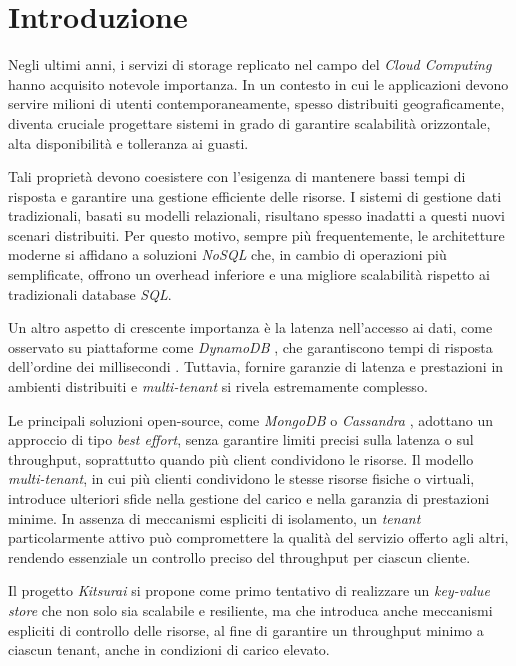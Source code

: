 \section{Introduzione}
\label{sec:introduzione}

Negli ultimi anni, i servizi di storage replicato nel campo del \textit{Cloud Computing} hanno acquisito notevole importanza.
In un contesto in cui le applicazioni devono servire milioni di utenti contemporaneamente, spesso distribuiti geograficamente, diventa cruciale progettare sistemi in grado di garantire scalabilità orizzontale, alta disponibilità e tolleranza ai guasti.

Tali proprietà devono coesistere con l'esigenza di mantenere bassi tempi di risposta e garantire una gestione efficiente delle risorse.
I sistemi di gestione dati tradizionali, basati su modelli relazionali, risultano spesso inadatti a questi nuovi scenari distribuiti.
Per questo motivo, sempre più frequentemente, le architetture moderne si affidano a soluzioni \textit{NoSQL} che, in cambio di operazioni più semplificate, offrono un overhead inferiore e una migliore scalabilità rispetto ai tradizionali database \textit{SQL}.

Un altro aspetto di crescente importanza è la latenza nell'accesso ai dati, come osservato su piattaforme come \textit{DynamoDB} \cite{Dynamo2007}, che garantiscono tempi di risposta dell'ordine dei millisecondi \cite{DynamoWhitepaper}.
Tuttavia, fornire garanzie di latenza e prestazioni in ambienti distribuiti e \textit{multi-tenant} si rivela estremamente complesso.

Le principali soluzioni open-source, come \textit{MongoDB} \cite{Mongo} o \textit{Cassandra} \cite{Cassandra}, adottano un approccio di tipo \textit{best effort}, senza garantire limiti precisi sulla latenza o sul throughput, soprattutto quando più client condividono le risorse.
Il modello \textit{multi-tenant}, in cui più clienti condividono le stesse risorse fisiche o virtuali, introduce ulteriori sfide nella gestione del carico e nella garanzia di prestazioni minime.
In assenza di meccanismi espliciti di isolamento, un \textit{tenant} particolarmente attivo può compromettere la qualità del servizio offerto agli altri, rendendo essenziale un controllo preciso del throughput per ciascun cliente.

Il progetto \textit{Kitsurai} si propone come primo tentativo di realizzare un \textit{key-value store} che non solo sia scalabile e resiliente, ma che introduca anche meccanismi espliciti di controllo delle risorse, al fine di garantire un throughput minimo a ciascun tenant, anche in condizioni di carico elevato.

